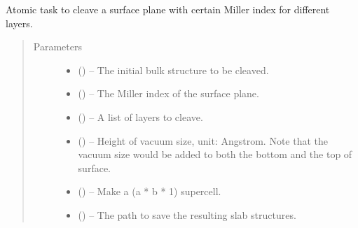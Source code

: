 \documentclass[letterpaper,10pt,english,openany,oneside]{sphinxmanual}
\begin{document}

\begin{fulllineitems}
\label{\detokenize{index:ogre.generators.atomic_task}}
Atomic task to cleave a surface plane with certain Miller index for
different layers.
\begin{quote}\begin{description}
\item[{Parameters}] \leavevmode\begin{itemize}
\item {} 
 () -- The initial bulk structure to be cleaved.

\item {} 
 () -- The Miller index of the surface plane.

\item {} 
 () -- A list of layers to cleave.

\item {} 
 () -- Height of vacuum size, unit: Angstrom. Note that the vacuum size
would be added to both the bottom and the top of surface.

\item {} 
 () -- Make a (a * b * 1) supercell.

\item {} 
 () -- The path to save the resulting slab structures.

\end{itemize}

\end{description}\end{quote}

\end{fulllineitems}
\end{document}
